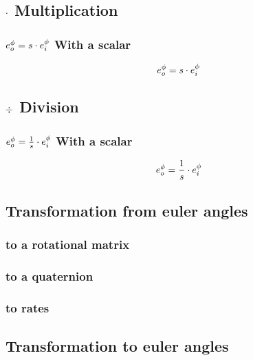 \subsection{$\multiplication$ Multiplication}
\subsubsection*{$\eu{e_o} = s \multiplication \eu{e_i}$ With a scalar}
\begin{equation}
\eu e_o = s \multiplication \eu{e_i}
\end{equation}




\subsection{$\division$ Division}
\subsubsection*{$\eu{e_o} = \frac 1 s \multiplication \eu{e_i}$ With a scalar}
\begin{equation}
\eu{e_o} = \frac 1 s \multiplication \eu{e_i}
\end{equation}



\subsection{Transformation from euler angles}
\subsubsection*{to a rotational matrix}


\subsubsection*{to a quaternion}


\subsubsection*{to rates}





\subsection{Transformation to euler angles}
